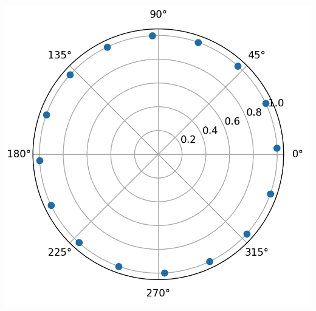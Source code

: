 \begin{listing}
    \noindent
    \begin{minipage}{0.49\textwidth}
        \strut\vspace*{-\baselineskip}\newline
        \inputminted[firstline=4]{python3}{code/disc_harms_comp.py}
    \end{minipage}%
    \begin{minipage}{0.3\textwidth}
        \strut\vspace*{-\baselineskip}\newline
        \includegraphics[width=\textwidth]{code/disc_harms_comp.png}


\end{minipage}
\end{listing}
